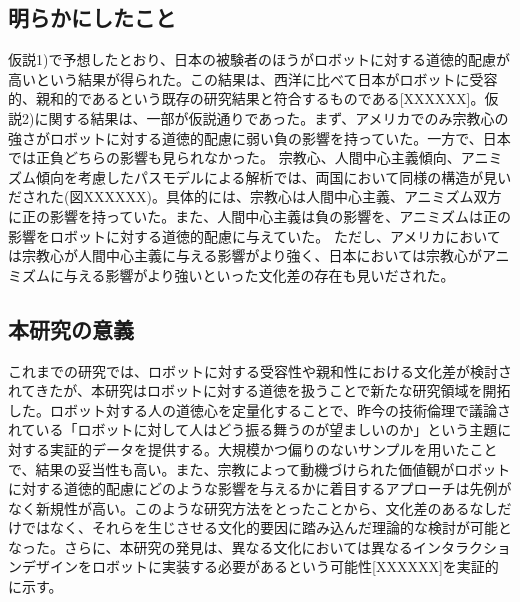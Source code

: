 \documentclass[twocolumn, a4j,10pt]{jarticle}
\begin{document}
\subsection*{明らかにしたこと}\vspace{-3mm}
仮説1)で予想したとおり、日本の被験者のほうがロボットに対する道徳的配慮が高いという結果が得られた。この結果は、西洋に比べて日本がロボットに受容的、親和的であるという既存の研究結果と符合するものである[XXXXXX]。仮説2)に関する結果は、一部が仮説通りであった。まず、アメリカでのみ宗教心の強さがロボットに対する道徳的配慮に弱い負の影響を持っていた。一方で、日本では正負どちらの影響も見られなかった。
宗教心、人間中心主義傾向、アニミズム傾向を考慮したパスモデルによる解析では、両国において同様の構造が見いだされた(図XXXXXX)。具体的には、宗教心は人間中心主義、アニミズム双方に正の影響を持っていた。また、人間中心主義は負の影響を、アニミズムは正の影響をロボットに対する道徳的配慮に与えていた。
ただし、アメリカにおいては宗教心が人間中心主義に与える影響がより強く、日本においては宗教心がアニミズムに与える影響がより強いといった文化差の存在も見いだされた。
\vspace{-7mm}
\subsection*{本研究の意義}\vspace{-3mm}
これまでの研究では、ロボットに対する受容性や親和性における文化差が検討されてきたが、本研究はロボットに対する道徳を扱うことで新たな研究領域を開拓した。ロボット対する人の道徳心を定量化することで、昨今の技術倫理で議論されている「ロボットに対して人はどう振る舞うのが望ましいのか」という主題に対する実証的データを提供する。大規模かつ偏りのないサンプルを用いたことで、結果の妥当性も高い。また、宗教によって動機づけられた価値観がロボットに対する道徳的配慮にどのような影響を与えるかに着目するアプローチは先例がなく新規性が高い。このような研究方法をとったことから、文化差のあるなしだけではなく、それらを生じさせる文化的要因に踏み込んだ理論的な検討が可能となった。さらに、本研究の発見は、異なる文化においては異なるインタラクションデザインをロボットに実装する必要があるという可能性[XXXXXX]を実証的に示す。
\end{document}
